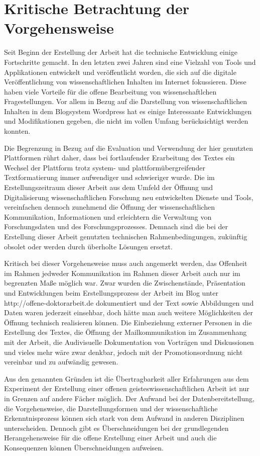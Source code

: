 \section{Kritische Betrachtung der Vorgehensweise}

Seit Beginn der Erstellung der Arbeit hat die technische Entwicklung einige Fortschritte gemacht. In den letzten zwei Jahren sind eine Vielzahl von Tools und Applikationen entwickelt und veröffentlicht worden, die sich auf die digitale Veröffentlichung von wissenschaftlichen Inhalten im Internet fokussieren. Diese haben viele Vorteile für die offene Bearbeitung von wissenschaftlchen Fragestellungen. Vor allem in Bezug auf die Darstellung von wissenschaftlichen Inhalten in dem Blogsystem Wordpress hat es einige Interessante Entwicklungen und Modifikationen gegeben, die nicht im vollen Umfang berücksichtigt werden konnten.

Die Begrenzung in Bezug auf die Evaluation und Verwendung der hier genutzten Plattformen rührt daher, dass bei fortlaufender Erarbeitung des Textes ein Wechsel der Plattform trotz system- und plattformübergreifender Textformatierung immer aufwendiger und schwieriger wurde. Die im Erstellungszeitraum dieser Arbeit aus dem Umfeld der Öffnung und Digitalisierung wissenschaftlichen Forschung neu entwickelten Dienste und Tools, vereinfachen dennoch zunehmend die Öffnung der wissenschaftlichen Kommunikation, Informationen und erleichtern die Verwaltung von Forschungsdaten und des Forschungsprozesses. Demnach sind die bei der Erstellung dieser Arbeit genutzten technischen Rahmenbedingungen, zukünftig obsolet oder werden durch überholte Lösungen ersetzt.

Kritisch bei dieser Vorgehensweise muss auch angemerkt werden, das Offenheit im Rahmen jedweder Kommunikation im Rahmen dieser Arbeit auch nur im begrenzten Maße möglich war. Zwar wurden die Zwischenstände, Präsentation und Entwicklungen beim Erstellungsprozess der Arbeit im Blog unter http://offene-doktorarbeit.de dokumentiert und der Text sowie Abbildungen und Daten waren jederzeit einsehbar, doch hätte man auch weitere Möglichkeiten der Öffnung technisch realisieren können. Die Einbeziehung externer Personen in die Erstellung des Textes, die Öffnung der Mailkommunikation im Zusammenhang mit der Arbeit, die Audivisuelle Dokumentation von Vorträgen und Diskussionen und vieles mehr wäre zwar denkbar, jedoch mit der Promotionsordnung nicht vereinbar und zu aufwändig gewesen.

Aus den genannten Gründen ist die Übertragbarkeit aller Erfahrungen aus dem Experiment der Erstellung einer offenen geisteswissenschaftlichen Arbeit ist nur in Grenzen auf andere Fächer möglich. Der Aufwand bei der Datenbereitstellung, die Vorgehensweise, die Darstellungsformen und der wissenschaftliche Erkenntnisprozess können sich stark von dem Aufwand in anderen Disziplinen unterscheiden. Dennoch gibt es Überschneidungen bei der grundlegenden Herangehensweise für die offene Erstellung einer Arbeit und auch die Konsequenzen können Überschneidungen aufweisen.

